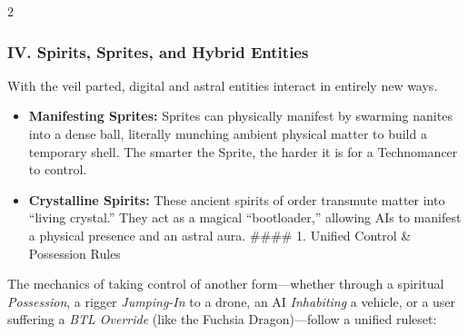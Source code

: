 \documentclass[
  oneside]{article}
\providecommand{\tightlist}{%
  \setlength{\itemsep}{0pt}\setlength{\parskip}{0pt}}
\begin{document}
\begin{multicols}{2}
\hypertarget{iv.-spirits-sprites-and-hybrid-entities}{%
\subsubsection{IV. Spirits, Sprites, and Hybrid
Entities}\label{iv.-spirits-sprites-and-hybrid-entities}}

With the veil parted, digital and astral entities
interact in entirely new ways.

\begin{itemize}
\tightlist
\item
  \textbf{Manifesting Sprites:} Sprites can
  physically manifest by swarming nanites into a
  dense ball, literally munching ambient physical
  matter to build a temporary shell. The smarter
  the Sprite, the harder it is for a Technomancer
  to control.
\item
  \textbf{Crystalline Spirits:} These ancient
  spirits of order transmute matter into ``living
  crystal.'' They act as a magical ``bootloader,''
  allowing AIs to manifest a physical presence and
  an astral aura. \#\#\#\# 1. Unified Control \&
  Possession Rules
\end{itemize}

The mechanics of taking control of another
form---whether through a spiritual
\emph{Possession}, a rigger \emph{Jumping-In} to a
drone, an AI \emph{Inhabiting} a vehicle, or a
user suffering a \emph{BTL Override} (like the
Fuchsia Dragon)---follow a unified ruleset:


\end{multicols}
\end{document}
